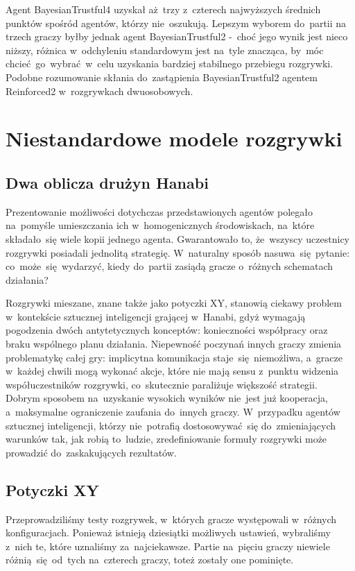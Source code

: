 \documentclass[declaration,shortabstract,inz]{iithesis}
\begin{document}
 Agent BayesianTrustful4 uzyskał aż~trzy z~czterech najwyższych średnich punktów spośród agentów, którzy nie~oszukują. Lepszym wyborem do~partii na trzech graczy byłby jednak agent BayesianTrustful2 -~choć jego wynik jest nieco niższy, różnica w~odchyleniu standardowym jest na~tyle znacząca, by~móc chcieć go~wybrać w~celu uzyskania bardziej stabilnego przebiegu rozgrywki. Podobne rozumowanie skłania do~zastąpienia BayesianTrustful2 agentem Reinforced2 w~rozgrywkach dwuosobowych.

\chapter{Niestandardowe modele rozgrywki}

\section{Dwa oblicza drużyn Hanabi}

Prezentowanie możliwości dotychczas przedstawionych agentów polegało na~pomyśle umieszczania ich w~homogenicznych środowiskach, na~które składało~się wiele kopii jednego agenta. Gwarantowało to, że~wszyscy uczestnicy rozgrywki posiadali jednolitą strategię. W~naturalny sposób nasuwa~się pytanie: co~może~się wydarzyć, kiedy do~partii zasiądą gracze o~różnych schematach działania?

Rozgrywki mieszane, znane także jako potyczki XY, stanowią ciekawy problem w~kontekście sztucznej inteligencji grającej w~Hanabi, gdyż wymagają pogodzenia dwóch antytetycznych konceptów: konieczności współpracy oraz braku wspólnego planu działania. Niepewność poczynań innych graczy zmienia problematykę całej gry: implicytna komunikacja staje~się niemożliwa, a~gracze w~każdej chwili mogą wykonać akcje, które nie mają sensu z~punktu widzenia współuczestników rozgrywki, co~skutecznie paraliżuje większość strategii. Dobrym sposobem na~uzyskanie wysokich wyników nie~jest już kooperacja, a~maksymalne ograniczenie zaufania do~innych graczy. W~przypadku agentów sztucznej inteligencji, którzy nie~potrafią dostosowywać~się do~zmieniających warunków tak, jak robią to~ludzie, zredefiniowanie formuły rozgrywki może prowadzić do~zaskakujących rezultatów.

\section{Potyczki XY}

Przeprowadziliśmy testy rozgrywek, w~których gracze występowali w~różnych konfiguracjach. Ponieważ istnieją dziesiątki możliwych ustawień, wybraliśmy z~nich te, które uznaliśmy za~najciekawsze. Partie na~pięciu graczy niewiele różnią~się od~tych na~czterech graczy, toteż zostały one pominięte.
\end{document}
